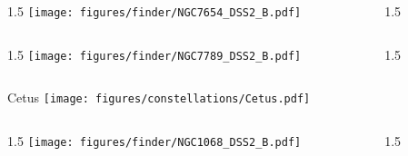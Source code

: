 \documentclass[final]{beamer}
\newlength{\colwidth}
\begin{document}

\begin{frame}[t]{}
  \begin{columns}[T]
    \begin{column}{1.5\colwidth}
      \centering
      \texttt{[image: figures/finder/NGC7654\_DSS2\_B.pdf]}
    \end{column}
    \begin{column}{1.5\colwidth}
      \Large
      
    \end{column}
  \end{columns}
  \vspace{\fill}
  \begin{columns}[T]
    \begin{column}{1.5\colwidth}
      \centering
      \texttt{[image: figures/finder/NGC7789\_DSS2\_B.pdf]}
    \end{column}
    \begin{column}{1.5\colwidth}
      \Large
      
    \end{column}
  \end{columns}
\end{frame}


\begin{frame}[t]{\LARGE Cetus}
  \centering
  \texttt{[image: figures/constellations/Cetus.pdf]}
\end{frame}


\begin{frame}[t]{}
  \begin{columns}[T]
    \begin{column}{1.5\colwidth}
      \centering
      \texttt{[image: figures/finder/NGC1068\_DSS2\_B.pdf]}
    \end{column}
    \begin{column}{1.5\colwidth}
      \Large
      
    \end{column}
  \end{columns}
  \vspace{\fill}
\end{frame}
\end{document}
